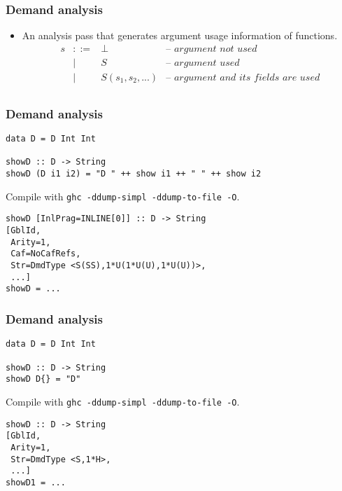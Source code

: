 \documentclass{beamer}
\begin{document}
\begin{frame}
    \frametitle{Demand analysis}

    \begin{itemize}
        \item
            An analysis pass that generates argument usage information of
            functions. \\

            \[
                \begin{array}{rcll}
                    s & ::= & \perp & \textit{-- argument not used} \\
                      & |   & S & \textit{-- argument used} \\
                      & |   & S(s_1, s_2, ...) & \textit{-- argument and its fields are used} \\
                \end{array}
            \]
    \end{itemize}
\end{frame}

\begin{frame}[fragile]
    \frametitle{Demand analysis}
    \begin{verbatim}
data D = D Int Int

showD :: D -> String
showD (D i1 i2) = "D " ++ show i1 ++ " " ++ show i2
    \end{verbatim}

    Compile with \texttt{ghc -ddump-simpl -ddump-to-file -O}. \\

    \begin{verbatim}
showD [InlPrag=INLINE[0]] :: D -> String
[GblId,
 Arity=1,
 Caf=NoCafRefs,
 Str=DmdType <S(SS),1*U(1*U(U),1*U(U))>,
 ...]
showD = ...
    \end{verbatim}
\end{frame}

\begin{frame}[fragile]
    \frametitle{Demand analysis}
    \begin{verbatim}
data D = D Int Int

showD :: D -> String
showD D{} = "D"
    \end{verbatim}

    Compile with \texttt{ghc -ddump-simpl -ddump-to-file -O}. \\

    \begin{verbatim}
showD :: D -> String
[GblId,
 Arity=1,
 Str=DmdType <S,1*H>,
 ...]
showD1 = ...
    \end{verbatim}
\end{frame}
\end{document}
